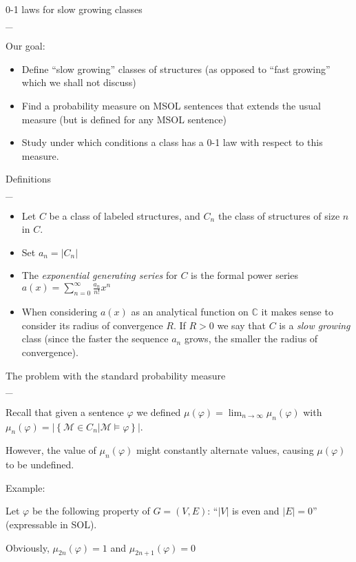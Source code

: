\documentclass[landscape,a4]{myslides}
\begin{document}
\begin{slide}
\begin{center}
{%
\color{blue}
0-1 laws for slow growing classes
}
\\
\_\hrulefill
\end{center}

Our goal:
{\small
\begin{itemize}
\item
Define ``slow growing'' classes of structures (as opposed to ``fast growing'' which we shall not discuss)
\item
Find a probability measure on MSOL sentences that extends the usual measure (but is defined for any MSOL sentence)
\item
Study under which conditions a class has a 0-1 law with respect to this measure.
\end{itemize}
}
\end{slide}
 
\begin{slide}
\begin{center}
{%
\color{blue}
Definitions
}
\\
\_\hrulefill

\end{center}
\small
\begin{itemize}
 \item Let $C$ be a class of labeled structures, and $C_n$ the class of structures of size $n$ in $C$.
 \item Set $a_n = |C_n|$
 \item The \emph{exponential generating series} for $C$ is the formal power series $a(x)=\sum_{n=0}^\infty\frac{a_n}{n!}x^n$
 \item When considering $a(x)$ as an analytical function on $\mathbb{C}$ it makes sense to consider its radius of convergence $R$. If $R>0$ we say that $C$ is
a \emph{slow growing} class (since the faster the sequence $a_n$ grows, the smaller the radius of convergence).
\end{itemize}

\end{slide}

\begin{slide}
\begin{center}
{%
\color{blue}
The problem with the standard probability measure
}
\\
\_\hrulefill


\end{center}

\small
Recall that given a  sentence $\varphi$ we defined $\mu(\varphi)=\lim_{n\to\infty}\mu_n(\varphi)$ with $\mu_n(\varphi)=|\left\{\mathcal{M}\in C_n|\mathcal{M}\models\varphi \right\}|$.

However, the value of $\mu_n(\varphi)$ might constantly alternate values, causing $\mu(\varphi)$ to be undefined.

Example:

Let $\varphi$ be the following property of $G=(V,E)$: ``$|V|$ is even and $|E|=0$'' (expressable in SOL).

Obviously, $\mu_{2n}(\varphi) = 1$ and $\mu_{2n+1}(\varphi) = 0$
\end{slide}
\end{document}
